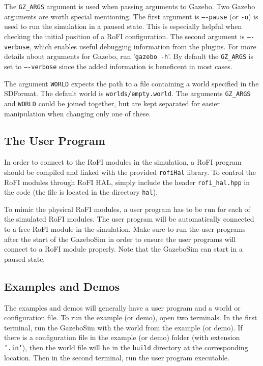 \documentclass[
  printed, %
  color,   %
  notable, %
  oneside, %
  nolof,   %
  nolot,   %
  nocover,
]{fithesis3}
\newcommand{\code}[1]{\texttt{#1}}
\begin{document}
The \code{GZ\_ARGS} argument is used when passing arguments to Gazebo.
Two Gazebo arguments are worth special mentioning.
The first argument is \code{----pause} (or \code{-u}) is used to run the simulation in a paused state.
This is especially helpful when checking the initial position of a RoFI configuration.
The second argument is \code{----verbose}, which enables useful debugging information from the plugins.
For more details about arguments for Gazebo, run '\code{gazebo -h}'.
By default the \code{GZ\_ARGS} is set to \code{----verbose} since the added information is beneficent in most cases.

The argument \code{WORLD} expects the path to a file containing a world specified in the SDFormat.
The default world is \code{worlds/empty.world}.
The arguments \code{GZ\_ARGS} and \code{WORLD} could be joined together, but are kept separated for easier manipulation when changing only one of these.

\subsection{The User Program}

In order to connect to the RoFI modules in the simulation, a RoFI program should be compiled and linked with the provided \code{rofiHal} library.
To control the RoFI modules through RoFI HAL, simply include the header \code{rofi\_hal.hpp} in the code (the file is located in the directory \code{hal}).

To mimic the physical RoFI modules, a user program has to be run for each of the simulated RoFI modules.
The user program will be automatically connected to a free RoFI module in the simulation.
Make sure to run the user programs after the start of the GazeboSim in order to ensure the user programs will connect to a RoFI module properly.
Note that the GazeboSim can start in a paused state.

\subsection{Examples and Demos}

The examples and demos will generally have a user program and a world or configuration file.
To run the example (or demo), open two terminals.
In the first terminal, run the GazeboSim with the world from the example (or demo).
If there is a configuration file in the example (or demo) folder (with extension \code{'.in'}), then the world file will be in the \code{build} directory at the corresponding location.
Then in the second terminal, run the user program executable.
\end{document}
